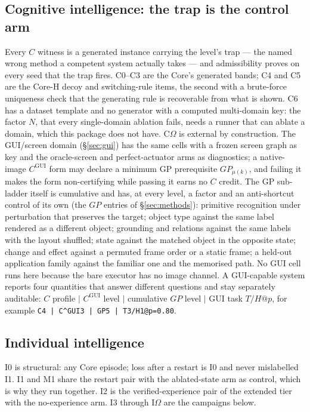 \documentclass[11pt]{article}
\theoremstyle{definition}
\begin{document}
\subsection{Cognitive intelligence: the trap is the control arm}
Every $C$ witness is a generated instance carrying the level's trap --- the named wrong method a competent system actually takes --- and admissibility proves on every seed that the trap fires. C0--C3 are the Core's generated bands; C4 and C5 are the Core-H decoy and switching-rule items, the second with a brute-force uniqueness check that the generating rule is recoverable from what is shown. C6 has a dataset template and no generator with a computed multi-domain key: the factor $N$, that every single-domain ablation fails, needs a runner that can ablate a domain, which this package does not have. C$\Omega$ is external by construction. The GUI/screen domain (\S\ref{sec:gui}) has the same cells with a frozen screen graph as key and the oracle-screen and perfect-actuator arms as diagnostics; a native-image $C^{\mathrm{GUI}}$ form may declare a minimum GP prerequisite $GP_{\mu(k)}$, and failing it makes the form non-certifying while passing it earns no $C$ credit. The GP sub-ladder itself is cumulative and has, at every level, a factor and an anti-shortcut control of its own (the $GP$ entries of \S\ref{sec:methods}): primitive recognition under perturbation that preserves the target; object type against the same label rendered as a different object; grounding and relations against the same labels with the layout shuffled; state against the matched object in the opposite state; change and effect against a permuted frame order or a static frame; a held-out application family against the familiar one and the memorised path. No GUI cell runs here because the bare executor has no image channel. A GUI-capable system reports four quantities that answer different questions and stay separately auditable: $C$ profile $\mid$ $C^{\mathrm{GUI}}$ level $\mid$ cumulative $GP$ level $\mid$ GUI task $T/H@p$, for example \texttt{C4 | C\^{}GUI3 | GP5 | T3/H1@p=0.80}.

\subsection{Individual intelligence}
I0 is structural: any Core episode; loss after a restart is I0 and never mislabelled I1. I1 and M1 share the restart pair with the ablated-state arm as control, which is why they run together. I2 is the verified-experience pair of the extended tier with the no-experience arm. I3 through I$\Omega$ are the campaigns below.
\end{document}
